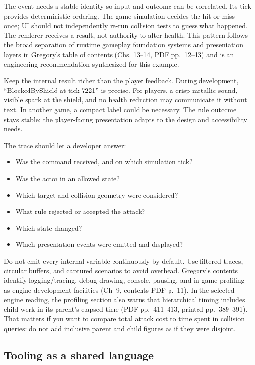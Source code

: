 The event needs a stable identity so input and outcome can be correlated. Its tick provides deterministic ordering. The game simulation decides the hit or miss once; UI should not independently re-run collision tests to guess what happened. The renderer receives a result, not authority to alter health. This pattern follows the broad separation of runtime gameplay foundation systems and presentation layers in Gregory's table of contents (Chs. 13--14, PDF pp.~12--13) and is an engineering recommendation synthesized for this example.

Keep the internal result richer than the player feedback. During development, ``BlockedByShield at tick 7221'' is precise. For players, a crisp metallic sound, visible spark at the shield, and no health reduction may communicate it without text. In another game, a compact label could be necessary. The rule outcome stays stable; the player-facing presentation adapts to the design and accessibility needs.

The trace should let a developer answer:

\begin{itemize}
\tightlist
\item
  Was the command received, and on which simulation tick?
\item
  Was the actor in an allowed state?
\item
  Which target and collision geometry were considered?
\item
  What rule rejected or accepted the attack?
\item
  Which state changed?
\item
  Which presentation events were emitted and displayed?
\end{itemize}

Do not emit every internal variable continuously by default. Use filtered traces, circular buffers, and captured scenarios to avoid overhead. Gregory's contents identify logging/tracing, debug drawing, console, pausing, and in-game profiling as engine development facilities (Ch. 9, contents PDF p.~11). In the selected engine reading, the profiling section also warns that hierarchical timing includes child work in its parent's elapsed time (PDF pp.~411--413, printed pp.~389--391). That matters if you want to compare total attack cost to time spent in collision queries: do not add inclusive parent and child figures as if they were disjoint.

\subsection{Tooling as a shared language}\label{06-engine-ii-ch032-tooling-as-a-shared-language}

